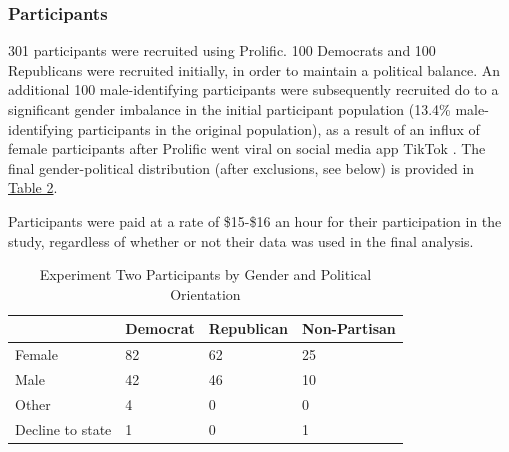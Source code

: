 \documentclass[10pt,letterpaper]{article}
\begin{document}
	\subsubsection{Participants} 301 participants were recruited using Prolific. 100 Democrats and 100 Republicans were recruited initially, in order to maintain a political balance. An additional 100 male-identifying participants were subsequently recruited do to a significant gender imbalance in the initial participant population (13.4\% male-identifying participants in the original population), as a result of an influx of female participants after Prolific went viral on social media app TikTok \parencite{charalambides2021}. The final gender-political distribution (after exclusions, see below) is provided in \hyperref[exp2-sample-table]{Table 2}.\par
	Participants were paid at a rate of \$15-\$16 an hour for their participation in the study, regardless of whether or not their data was used in the final analysis.
	
	\begin{table}[!ht]
		\begin{center} 
			\caption{Experiment Two Participants by Gender and Political Orientation} 
			\label{exp2-sample-table} 
			\vskip 0.12in
			\begin{tabular}{llll} 
				\hline
				&  Democrat & Republican & Non-Partisan \\
				\hline
				Female &  82 & 62 & 25 \\
				Male & 42 & 46 & 10 \\
				Other & 4 & 0 & 0 \\
				Decline to state & 1 & 0 & 1 \\
				\hline
			\end{tabular} 
		\end{center} 
	\end{table}
	
\end{document}
